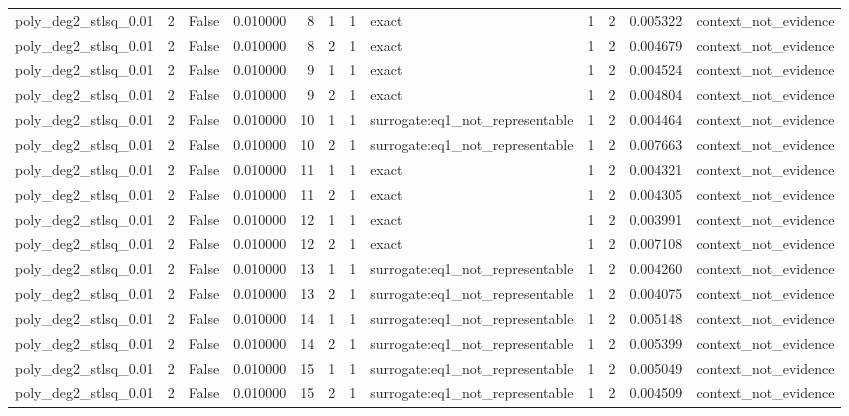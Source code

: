 \begin{tabular}{lrrrrrrlrrrl}
poly\_deg2\_stlsq\_0.01 & 2 & False & 0.010000 & 8 & 1 & 1 & exact & 1 & 2 & 0.005322 & context\_not\_evidence \\
poly\_deg2\_stlsq\_0.01 & 2 & False & 0.010000 & 8 & 2 & 1 & exact & 1 & 2 & 0.004679 & context\_not\_evidence \\
poly\_deg2\_stlsq\_0.01 & 2 & False & 0.010000 & 9 & 1 & 1 & exact & 1 & 2 & 0.004524 & context\_not\_evidence \\
poly\_deg2\_stlsq\_0.01 & 2 & False & 0.010000 & 9 & 2 & 1 & exact & 1 & 2 & 0.004804 & context\_not\_evidence \\
poly\_deg2\_stlsq\_0.01 & 2 & False & 0.010000 & 10 & 1 & 1 & surrogate:eq1\_not\_representable & 1 & 2 & 0.004464 & context\_not\_evidence \\
poly\_deg2\_stlsq\_0.01 & 2 & False & 0.010000 & 10 & 2 & 1 & surrogate:eq1\_not\_representable & 1 & 2 & 0.007663 & context\_not\_evidence \\
poly\_deg2\_stlsq\_0.01 & 2 & False & 0.010000 & 11 & 1 & 1 & exact & 1 & 2 & 0.004321 & context\_not\_evidence \\
poly\_deg2\_stlsq\_0.01 & 2 & False & 0.010000 & 11 & 2 & 1 & exact & 1 & 2 & 0.004305 & context\_not\_evidence \\
poly\_deg2\_stlsq\_0.01 & 2 & False & 0.010000 & 12 & 1 & 1 & exact & 1 & 2 & 0.003991 & context\_not\_evidence \\
poly\_deg2\_stlsq\_0.01 & 2 & False & 0.010000 & 12 & 2 & 1 & exact & 1 & 2 & 0.007108 & context\_not\_evidence \\
poly\_deg2\_stlsq\_0.01 & 2 & False & 0.010000 & 13 & 1 & 1 & surrogate:eq1\_not\_representable & 1 & 2 & 0.004260 & context\_not\_evidence \\
poly\_deg2\_stlsq\_0.01 & 2 & False & 0.010000 & 13 & 2 & 1 & surrogate:eq1\_not\_representable & 1 & 2 & 0.004075 & context\_not\_evidence \\
poly\_deg2\_stlsq\_0.01 & 2 & False & 0.010000 & 14 & 1 & 1 & surrogate:eq1\_not\_representable & 1 & 2 & 0.005148 & context\_not\_evidence \\
poly\_deg2\_stlsq\_0.01 & 2 & False & 0.010000 & 14 & 2 & 1 & surrogate:eq1\_not\_representable & 1 & 2 & 0.005399 & context\_not\_evidence \\
poly\_deg2\_stlsq\_0.01 & 2 & False & 0.010000 & 15 & 1 & 1 & surrogate:eq1\_not\_representable & 1 & 2 & 0.005049 & context\_not\_evidence \\
poly\_deg2\_stlsq\_0.01 & 2 & False & 0.010000 & 15 & 2 & 1 & surrogate:eq1\_not\_representable & 1 & 2 & 0.004509 & context\_not\_evidence \\

\end{tabular}

